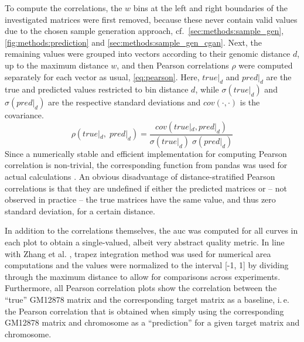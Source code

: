To compute the correlations, the $w$ bins at the left and right boundaries of the investigated matrices were first removed, because these never contain 
valid values due to the chosen sample generation approach, 
cf.~\cref{sec:methods:sample_gen}, \cref{fig:methods:prediction} and \ref{sec:methods:sample_gen_cgan}.
Next, the remaining values were grouped into vectors according to their genomic distance $d$, up to the maximum distance $w$, 
and then Pearson correlations $\rho$ were computed separately for each vector as usual, \cref{eq:pearson}.
Here, $\mathit{true}|_d$ and $\mathit{pred}|_d$ are the true and predicted values restricted to bin distance $d$, while
$\sigma(\mathit{true}|_d)$ and $\sigma(\mathit{pred}|_d)$ are the respective standard deviations and $cov(\cdot,\cdot)$ is the covariance.
\begin{equation}
 \rho(\mathit{true}|_d, \; \mathit{pred}|_d) = \frac{cov(\mathit{true}|_d, \mathit{pred}|_d)}{\sigma(\mathit{true}|_d)\; \sigma(\mathit{pred}|_d)} \label{eq:pearson}
\end{equation}
Since a numerically stable and efficient implementation for computing Pearson correlation is non-trivial, the corresponding function from pandas was used
for actual calculations \cite{pandasPearson}.
An obvious disadvantage of distance-stratified Pearson correlations is that they are undefined if either the predicted matrices or -- not observed in practice -- 
the true matrices have the same value, and thus zero standard deviation, for a certain distance.

In addition to the correlations themselves, the \acrfull{auc} was computed for all curves in each plot 
to obtain a single-valued, albeit very abstract quality metric.
In line with Zhang et al. \cite{Zhang2019}, trapez integration method was used for numerical area computations
and the values were normalized to the interval [-1, 1] by dividing through the maximum distance to allow for comparisons across experiments.
Furthermore, all Pearson correlation plots show the correlation between the ``true'' GM12878 matrix and the corresponding target matrix as a baseline,
i.\,e. the Pearson correlation that is obtained when simply using the corresponding GM12878 matrix and chromosome 
as a ``prediction'' for a given target matrix and chromosome.

